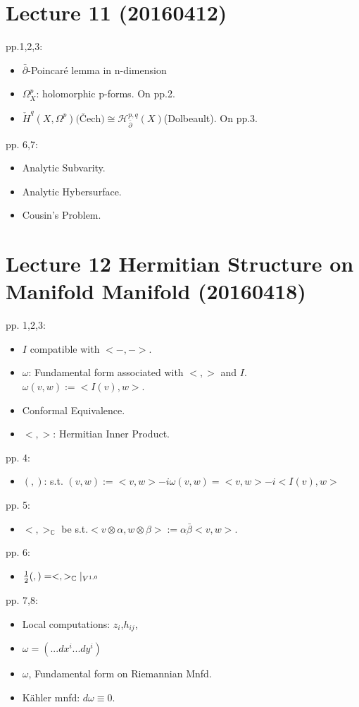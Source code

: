 \section{Lecture 11 (20160412)}
pp.1,2,3: 
\begin{itemize}
    \item $\bar{\partial}$-Poincaré lemma in n-dimension
    \item $\Omega_X^p$: holomorphic p-forms. On pp.2.
    \item $\check{H}^q(X,\Omega^p)\text{(Čech)}\cong \mathcal{H}_{\bar{\partial}}^{p,q}(X)$(Dolbeault). On pp.3.
\end{itemize}
pp. 6,7:
\begin{itemize}
    \item Analytic Subvarity.
    \item Analytic Hybersurface.
    \item Cousin's Problem.
\end{itemize}
	
\section{Lecture 12 Hermitian Structure on Manifold  Manifold (20160418)}
pp. 1,2,3:
\begin{itemize}
    \item $I$ compatible with $<-,->$.
    \item $\omega$: Fundamental form associated with $<,>$ and $I$. $\omega(v,w):= <I(v),w>$.
    \item Conformal Equivalence.
    \item $<,>$: Hermitian Inner Product.
\end{itemize}
pp. 4:
\begin{itemize}
    \item $( , )$: s.t. $(v,w):=<v,w>-i\omega(v,w) = <v,w> - i <I(v),w>$
\end{itemize}
pp. 5:
\begin{itemize}
    \item $<,>_{\mathbb{C}}$ be s.t.$<v\otimes \alpha, w\otimes \beta>:= \alpha \bar{\beta} <v,w>$.
\end{itemize}
pp. 6:
\begin{itemize}
    \item $\frac{1}{2}(,) = <,>_{\mathbb{C}} \arrowvert_{V^{1,0}}$
\end{itemize}
pp. 7,8:
\begin{itemize}
    \item Local computations: $z_i$,$h_{ij}$,
    \item $\omega = (...dx^i...dy^i)$
    \item $\omega$, Fundamental form on Riemannian Mnfd.
    \item Kähler mnfd: $d\omega \equiv 0$.
\end{itemize}
	
